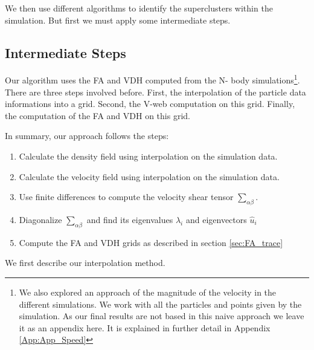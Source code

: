 \documentclass[12pt]{article}
\begin{document}
We then use different algorithms to identify the
 superclusters within the simulation. But first we must apply some intermediate steps.\\

\subsection{Intermediate Steps} \label{sec:approaches}
\begin{par}

Our algorithm uses the FA and VDH computed from the N-
body simulations\footnote{
We also explored an approach of
 the magnitude of the velocity in the different
  simulations. We work with all the particles and
   points given by the simulation. As our final
    results are not based in this naive approach
     we leave it as an appendix here. It is
      explained in further detail in Appendix
       \ref{App:App_Speed}}. There are three steps involved before.
 First, the interpolation of the particle data
  informations into a grid. Second, the V-web computation
   on this grid. Finally, the computation of the FA and
    VDH on this grid. \\
\end{par}

\begin{par}
In summary, our approach follows the steps:
\end{par}

\begin{enumerate}
\item Calculate the density field using interpolation on the simulation data.
\item Calculate the velocity field using interpolation on the simulation data.
\item Use finite differences to compute the velocity shear tensor $\sum_{\alpha \beta}$.
\item Diagonalize $\sum_{\alpha \beta}$ and find its eigenvalues $\lambda_i$ and eigenvectors $\hat{u}_i$
\item Compute the FA and VDH grids as described in section \ref{sec:FA_trace} 
\end{enumerate}

We first describe our interpolation method.
\end{document}
